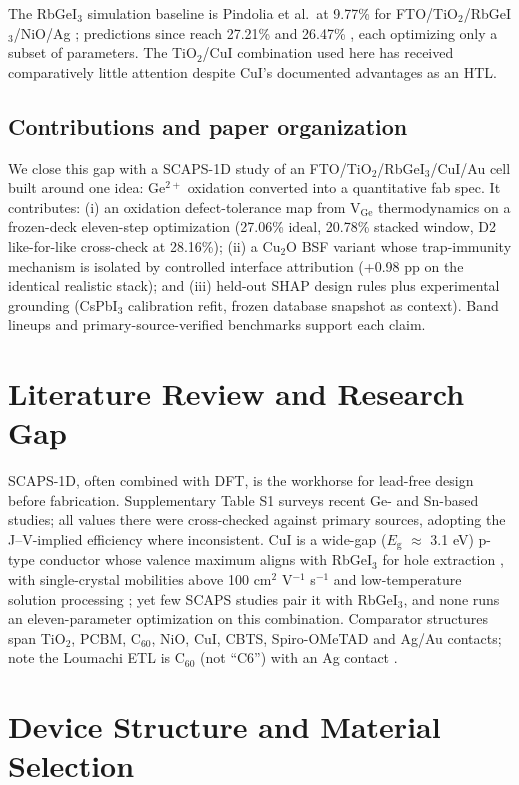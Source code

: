 \documentclass[aip,jap,amsmath,amssymb,preprint]{revtex4-2}
\begin{document}
The RbGeI$_{3}$ simulation baseline is Pindolia et al.\ at 9.77\% for FTO/\allowbreak{}TiO$_{2}$/RbGeI$_{3}$/NiO/\allowbreak{}Ag \cite{r14}; predictions since reach 27.21\% \cite{r22} and 26.47\% \cite{r23}, each optimizing only a subset of parameters. The TiO$_{2}$/CuI combination used here has received comparatively little attention despite CuI's documented advantages as an HTL.

\subsection{Contributions and paper organization}
We close this gap with a SCAPS-1D study of an FTO/\allowbreak{}TiO$_{2}$/RbGeI$_{3}$/CuI/\allowbreak{}Au cell built around one idea: Ge$^{2+}$ oxidation converted into a quantitative fab spec. It contributes: (i) an oxidation defect-tolerance map from V$_{\mathrm{Ge}}$ thermodynamics on a frozen-deck eleven-step optimization (27.06\% ideal, 20.78\% stacked window, D2 like-for-like cross-check at 28.16\%); (ii) a Cu$_{2}$O BSF variant whose trap-immunity mechanism is isolated by controlled interface attribution (+0.98 pp on the identical realistic stack); and (iii) held-out SHAP design rules plus experimental grounding (CsPbI$_{3}$ calibration refit, frozen database snapshot as context). Band lineups and primary-source-verified benchmarks support each claim.


\section{Literature Review and Research Gap}
SCAPS-1D, often combined with DFT, is the workhorse for lead-free design before fabrication. Supplementary Table S1 surveys recent Ge- and Sn-based studies; all values there were cross-checked against primary sources, adopting the J--V-implied efficiency where inconsistent. CuI is a wide-gap ($E_{\mathrm{g}}$ $\approx$ 3.1 eV) p-type conductor whose valence maximum aligns with RbGeI$_{3}$ for hole extraction \cite{r25,r26}, with single-crystal mobilities above 100 cm$^{2}$ V$^{-1}$ s$^{-1}$ and low-temperature solution processing \cite{r27}; yet few SCAPS studies pair it with RbGeI$_{3}$, and none runs an eleven-parameter optimization on this combination. Comparator structures span TiO$_{2}$, PCBM, C$_{60}$, NiO, CuI, CBTS, Spiro-OMeTAD and Ag/Au contacts; note the Loumachi ETL is C$_{60}$ (not ``C6'') with an Ag contact \cite{r22}.

\section{Device Structure and Material Selection}
\end{document}
